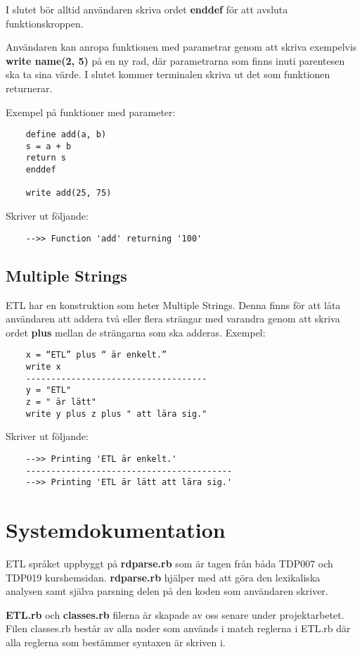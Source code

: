 \documentclass{TDP019mall}
\begin{document}
\begin{enumerate}
I slutet bör alltid användaren skriva ordet \textbf{enddef} för att avsluta funktionskroppen. 
 
Användaren kan anropa funktionen med parametrar genom att skriva exempelvis \textbf{write name(2, 5)} på en ny rad, där parametrarna 
som finns inuti parentesen ska ta sina värde. I slutet kommer terminalen skriva ut det som funktionen returnerar.  
 
 
Exempel på funktioner med parameter:
\begin{verbatim}
    define add(a, b)
    s = a + b
    return s
    enddef

    write add(25, 75)
\end{verbatim}
Skriver ut följande:
\begin{verbatim}
    -->> Function 'add' returning '100'
\end{verbatim}
\end{enumerate}



\subsection{Multiple Strings}
ETL har en konstruktion som heter Multiple Strings. Denna finns för att låta användaren att addera två eller flera strängar med 
varandra genom att skriva ordet \textbf{plus} mellan de strängarna som ska adderas.
Exempel: 
\begin{verbatim}
    x = “ETL” plus “ är enkelt.”
    write x
    ------------------------------------
    y = "ETL"
    z = " är lätt"
    write y plus z plus " att lära sig."
\end{verbatim}
 
Skriver ut följande:
\begin{verbatim}
    -->> Printing 'ETL är enkelt.'
    -----------------------------------------
    -->> Printing 'ETL är lätt att lära sig.'
\end{verbatim}



\newpage
\section{Systemdokumentation}
ETL språket uppbyggt på \textbf{rdparse.rb} som är tagen från båda TDP007 och TDP019 kurshemsidan. \textbf{rdparse.rb} hjälper med att göra den lexikaliska 
analysen samt själva parsning delen på den koden som användaren skriver. 

\textbf{ETL.rb} och \textbf{classes.rb} filerna är skapade av oss senare under projektarbetet. Filen classes.rb består av alla noder 
som används i match reglerna i ETL.rb där alla reglerna som bestämmer syntaxen är skriven i.  
\end{document}
